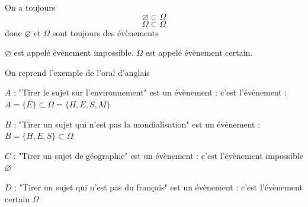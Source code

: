 On a toujours
$$\varnothing \subset \Omega$$
$$\Omega \subset \Omega$$
donc $\varnothing$ et $\Omega$ sont toujours des évènements\newline

$\varnothing$ est appelé évènement impossible. $\Omega$ est appelé évènement certain.\newline

\begin{exemple}
On reprend l'exemple de l'oral d'anglais \newline

$A$ : "Tirer le sujet sur l'environnement" est un évènement : c'est l'évènement : $A = \{E\} \subset \Omega = \{H,E,S,M\}$\newline

$B$ : "Tirer un sujet qui n'est pas la mondialisation" est un évènement :  $B = \{H,E,S\} \subset \Omega$ \newline

$C$ : "Tirer un sujet de géographie" est un évènement : c'est l'évènement impossible $\varnothing$ \newline

$D$ : "Tirer un sujet qui n'est pas du français" est un évènement : c'est l'évènement certain $\Omega$
\end{exemple}
\newline

